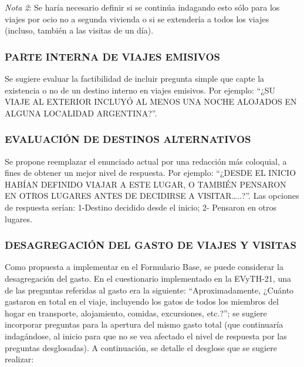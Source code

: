 \documentclass[
  openany]{book}
\begin{document}
\emph{Nota 2}: Se haría necesario definir si se continúa indagando esto sólo para los viajes por ocio no a segunda vivienda o si se extendería a todos los viajes (incluso, también a las visitas de un día).

\hypertarget{parte-interna-de-viajes-emisivos}{%
\subsubsection{\texorpdfstring{\textbf{PARTE INTERNA DE VIAJES EMISIVOS}}{PARTE INTERNA DE VIAJES EMISIVOS}}\label{parte-interna-de-viajes-emisivos}}

Se sugiere evaluar la factibilidad de incluir pregunta simple que capte la existencia o no de un destino interno en viajes emisivos.
Por ejemplo: ``¿SU VIAJE AL EXTERIOR INCLUYÓ AL MENOS UNA NOCHE ALOJADOS EN ALGUNA LOCALIDAD ARGENTINA?''.

\hypertarget{evaluaciuxf3n-de-destinos-alternativos}{%
\subsubsection{\texorpdfstring{\textbf{EVALUACIÓN DE DESTINOS ALTERNATIVOS}}{EVALUACIÓN DE DESTINOS ALTERNATIVOS}}\label{evaluaciuxf3n-de-destinos-alternativos}}

Se propone reemplazar el enunciado actual por una redacción más coloquial, a fines de obtener un mejor nivel de respuesta.
Por ejemplo: ``¿DESDE EL INICIO HABÍAN DEFINIDO VIAJAR A ESTE LUGAR, O TAMBIÉN PENSARON EN OTROS LUGARES ANTES DE DECIDIRSE A VISITAR\ldots..?''.
Las opciones de respuesta serían: 1-Destino decidido desde el inicio; 2- Pensaron en otros lugares.

\hypertarget{desagregaciuxf3n-del-gasto-de-viajes-y-visitas}{%
\subsubsection{\texorpdfstring{\textbf{DESAGREGACIÓN DEL GASTO DE VIAJES Y VISITAS}}{DESAGREGACIÓN DEL GASTO DE VIAJES Y VISITAS}}\label{desagregaciuxf3n-del-gasto-de-viajes-y-visitas}}

Como propuesta a implementar en el Formulario Base, se puede considerar la desagregación del gasto.
En el cuestionario implementado en la EVyTH-21, una de las preguntas referidas al gasto era la siguiente: ``Aproximadamente, ¿Cuánto gastaron en total en el viaje, incluyendo los gatos de todos los miembros del hogar en transporte, alojamiento, comidas, excursiones, etc.?''; se sugiere incorporar preguntas para la apertura del mismo gasto total (que continuaría indagándose, al inicio para que no se vea afectado el nivel de respuesta por las preguntas desglosadas).
A continuación, se detalle el desglose que se sugiere realizar:
\end{document}
